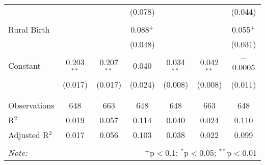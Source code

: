 \begin{table}[!htbp]
\begin{tabular}{@{\extracolsep{5pt}}lcccccc}
  &  &  & (0.078) &  &  & (0.044) \\ 
  & & & & & & \\ 
 Rural Birth &  &  & 0.088$^{+}$ &  &  & 0.055$^{+}$ \\ 
  &  &  & (0.048) &  &  & (0.031) \\ 
  & & & & & & \\ 
 Constant & 0.203$^{**}$ & 0.207$^{**}$ & 0.040 & 0.034$^{**}$ & 0.042$^{**}$ & $-$0.0005 \\ 
  & (0.017) & (0.017) & (0.024) & (0.008) & (0.008) & (0.011) \\ 
  & & & & & & \\ 
\hline \\[-1.8ex] 
Observations & 648 & 663 & 648 & 648 & 663 & 648 \\ 
R$^{2}$ & 0.019 & 0.057 & 0.114 & 0.040 & 0.024 & 0.110 \\ 
Adjusted R$^{2}$ & 0.017 & 0.056 & 0.103 & 0.038 & 0.022 & 0.099 \\ 
\hline 
\hline \\[-1.8ex] 
\textit{Note:}  & \multicolumn{6}{r}{$^{+}$p$<$0.1; $^{*}$p$<$0.05; $^{**}$p$<$0.01}} \\ 
\end{tabular} 
\end{table} 
